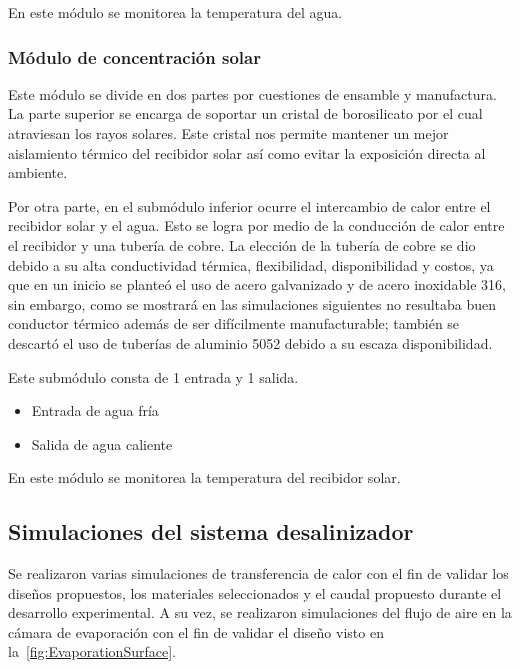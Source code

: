 				\begin{center}
					En este módulo se monitorea la temperatura del agua.
				\end{center}
			
			\subsubsection{Módulo de concentración solar}
				
				Este módulo se divide en dos partes por cuestiones de ensamble y manufactura. La parte superior se encarga de soportar un cristal de borosilicato por el cual atraviesan los rayos solares. Este cristal nos permite mantener un mejor aislamiento térmico del recibidor solar así como evitar la exposición directa al ambiente.
				
				Por otra parte, en el submódulo inferior ocurre el intercambio de calor entre el recibidor solar y el agua. Esto se logra por medio de la conducción de calor entre el recibidor y una tubería de cobre. La elección de la tubería de cobre se dio debido a su alta conductividad térmica, flexibilidad, disponibilidad y costos, ya que en un inicio se planteó el uso de acero galvanizado y de acero inoxidable 316, sin embargo, como se mostrará en las simulaciones siguientes no resultaba buen conductor térmico además de ser difícilmente manufacturable; también se descartó el uso de tuberías de aluminio 5052 debido a su escaza disponibilidad.
				
				Este submódulo consta de 1 entrada y 1 salida.
				
				\begin{itemize}[columns=2]
					\item Entrada de agua fría
					\item Salida de agua caliente
				\end{itemize}
				
				\begin{center}
					En este módulo se monitorea la temperatura del recibidor solar.
				\end{center}
		
		\subsection{Simulaciones del sistema desalinizador}
			
			Se realizaron varias simulaciones de transferencia de calor con el fin de validar los diseños propuestos, los materiales seleccionados y el caudal propuesto durante el desarrollo experimental. A su vez, se realizaron simulaciones del flujo de aire en la cámara de evaporación con el fin de validar el diseño visto en la~\cref{fig:EvaporationSurface}.
			
